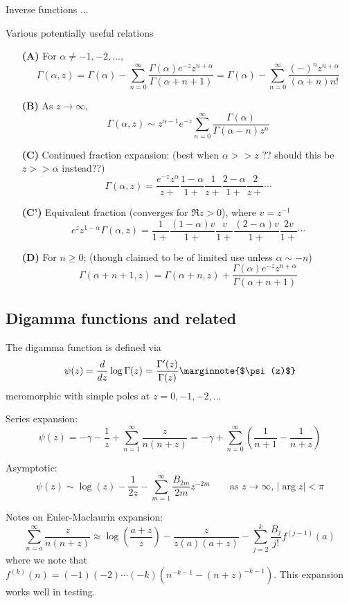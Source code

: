 \documentclass[10pt,dvipdfmx,letterpaper,twoside]{article}
\newenvironment{implementation}{\noindent\begin{framed}}{\end{framed}}
\let\DEF=\marginnote
\let\al=\alpha
\let\gam=\gamma
\let\Gam=\Gamma
\begin{document}
Inverse functions ...

\begin{implementation}
Various potentially useful relations
\begin{itemize}
\item[\bf(A)] For $\al\neq-1,-2,\dots$,
\[ \Gam(\al,z) = \Gam(\al) - \sum_{n=0}^\infty\frac{\Gam(\al)e^{-z}z^{n+\al}}{\Gam(\al+n+1)} = \Gam(\al) - \sum_{n=0}^\infty\frac{(-)^nz^{n+\al}}{(\al+n)n!} \]
\item[\bf(B)] As $z\to\infty$,
\[ \Gam(\al,z)\sim z^{\al-1}e^{-z}\sum_{n=0}^\infty\frac{\Gam(\al)}{\Gam(\al-n)z^n} \]
\item[\bf(C)] Continued fraction expansion: (best when $\al>>z$ ?? should this be $z>>\al$ instead??)
\[ \Gam(\al,z) = \frac{e^{-z}z^\al}{z+} \frac{1-\al}{1+} \frac{1}{z+} \frac{2-\al}{1+} \frac{2}{z+} \cdots \]
\item[\bf(C')] Equivalent fraction (converges for $\Re z>0$), where $v=z^{-1}$
\[ e^{z}z^{1-\al}\Gam(\al,z) = \frac{1}{1+} \frac{(1-\al)v}{1+} \frac{v}{1+} \frac{(2-\al)v}{1+} \frac{2v}{1+} \cdots \]
\item[\bf(D)] For $n\geq0$; (though claimed to be of limited use unless $\al\sim-n$)
\[ \Gam(\al+n+1, z) = \Gam(\al+n, z) + \frac{\Gam(\al)e^{-z}z^{n+\al}}{\Gam(\al+n+1)} \]
\end{itemize}
\end{implementation}

\subsection{Digamma functions and related}
The digamma function is defined via
\[ \psi(z) = \frac{d}{dz}\log\Gam(z) = \frac{\Gam'(z)}{\Gam(z)}   \DEF{$\psi(z)$}\]
meromorphic with simple poles at $z=0,-1,-2,\dots$

Series expansion:
\[ \psi(z) = -\gam - \frac1z + \sum_{n=1}^\infty\frac{z}{n(n+z)} = -\gam+\sum_{n=0}^\infty\left(\frac{1}{n+1}-\frac{1}{n+z}\right) \]

Asymptotic:
\[ \psi(z) \sim \log(z) - \frac{1}{2z} - \sum_{m=1}^\infty \frac{B_{2m}}{2m} z^{-2m} \qquad\text{as $z\to\infty$, $|\arg z|<\pi$} \]

Notes on Euler-Maclaurin expansion:
\[ \sum_{n=a}^\infty \frac{z}{n(n+z)} \approx \log(\frac{a+z}{z}) - \frac{z}{z(a)(a+z)} - \sum_{j=2}^k \frac{B_j}{j!} f^{(j-1)}(a) \]
where we note that $f^{(k)}(n) = (-1)(-2)\cdots(-k)(n^{-k-1}-(n+z)^{-k-1})$.  This expansion works well in testing.
\end{document}
